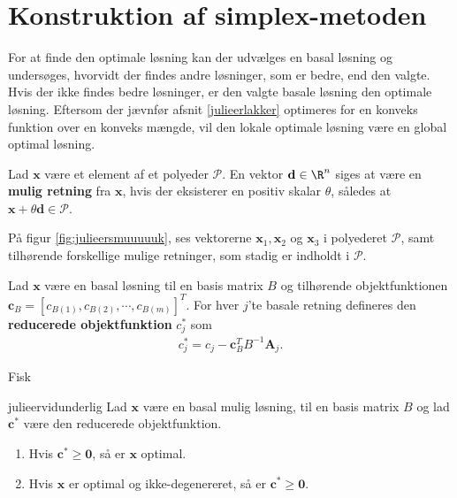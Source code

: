%
\section{Konstruktion af simplex-metoden}
\label{julieerfantalastiskogvidunderlig}
%
For at finde den optimale løsning kan der udvælges en basal løsning og undersøges, hvorvidt der findes andre løsninger, som er bedre, end den valgte. 
Hvis der ikke findes bedre løsninger, er den valgte basale løsning den optimale løsning. 
Eftersom der jævnfør afsnit \ref{julieerlakker} optimeres for en konveks funktion over en konveks mængde, %
vil den lokale optimale løsning være en global optimal løsning. 
%
%
\begin{defn}{}{}
Lad $\textbf{x}$ være et element af et polyeder $\mathcal{P}$.
En vektor $\textbf{d}\in \R^n$ siges at være en  \textbf{mulig retning} fra $\textbf{x}$, hvis der eksisterer en positiv skalar $\theta$, således at $\textbf{x}+\theta \textbf{d}\in \mathcal{P}$.
\end{defn}
\noindent
%
På figur \ref{fig:julieersmuuuuuk}, ses vektorerne $\mathbf{x}_1, \mathbf{x}_2$ og $\mathbf{x}_3$ i polyederet $\mathcal{P}$, samt tilhørende forskellige mulige retninger, som stadig er indholdt i $\mathcal{P}$.
%

%
%
%
\begin{defn}{}{}
Lad $\mathbf{x}$ være en basal løsning til en basis matrix $B$ og tilhørende objektfunktionen $\mathbf{c}_B=[ c_{B(1)},c_{B(2)}, \cdots , c_{B(m)} ]^T.$
For hver $j$'te basale retning defineres den \textbf{reducerede objektfunktion} $c_j^*$ som
\begin{align*}
c_j^* = c_j - \mathbf{c}_B^T B^{-1} \mathbf{A}_j.
\end{align*} 
%
\end{defn}
\noindent
%
Fisk
%
\begin{thm}{}{julieervidunderlig}
Lad $\mathbf{x}$ være en basal mulig løsning, til en basis matrix $B$ og lad $\mathbf{c}^*$ være den reducerede objektfunktion. 
\begin{enumerate}[label = (\alph*)]
\item Hvis $\mathbf{c}^* \geq \mathbf{0}$, så er $\mathbf{x}$ optimal.
\item Hvis $\mathbf{x}$ er optimal og ikke-degenereret, så er $\mathbf{c}^* \geq \mathbf{0}$.
\end{enumerate}
\end{thm}
